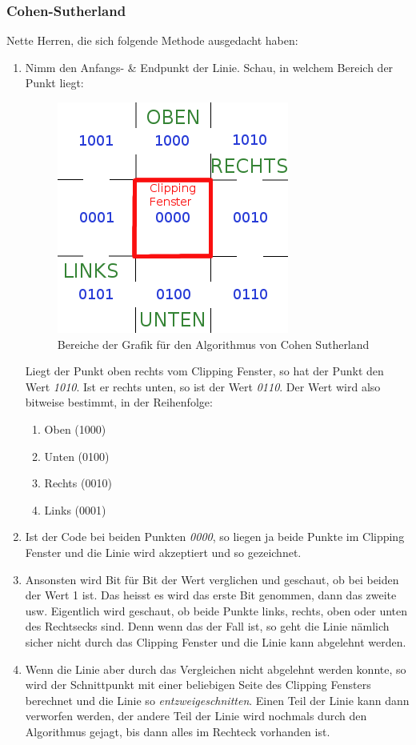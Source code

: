 \subsubsection{Cohen-Sutherland}
Nette Herren, die sich folgende Methode ausgedacht haben:
\begin{enumerate}
	\item Nimm den Anfangs- \& Endpunkt der Linie. Schau, in welchem Bereich der Punkt liegt:
	
	\begin{figure}[!ht]
		\centering
		\includegraphics[width=0.3\linewidth]{fig/cohen_sutherland}
		\caption{Bereiche der Grafik für den Algorithmus von Cohen Sutherland}
		\label{fig:cohen_sutherland}
	\end{figure}
	
	Liegt der Punkt oben rechts vom Clipping Fenster, so hat der Punkt den Wert \textit{1010}. Ist er rechts unten, so ist der Wert \textit{0110}. Der Wert wird also bitweise bestimmt, in der Reihenfolge:
	\begin{enumerate}
		\item Oben (1000)
		\item Unten (0100)
		\item Rechts (0010)
		\item Links (0001)
	\end{enumerate}
	\item Ist der Code bei beiden Punkten \textit{0000}, so liegen ja beide Punkte im Clipping Fenster und die Linie wird akzeptiert und so gezeichnet.
	\item Ansonsten wird Bit für Bit der Wert verglichen und geschaut, ob bei beiden der Wert 1 ist. Das heisst es wird das erste Bit genommen, dann das zweite usw. Eigentlich wird geschaut, ob beide Punkte links, rechts, oben oder unten des Rechtsecks sind. Denn wenn das der Fall ist, so geht die Linie nämlich sicher nicht durch das Clipping Fenster und die Linie kann abgelehnt werden.
	\item Wenn die Linie aber durch das Vergleichen nicht abgelehnt werden konnte, so wird der Schnittpunkt mit einer beliebigen Seite des Clipping Fensters berechnet und die Linie so \textit{entzweigeschnitten}. Einen Teil der Linie kann dann verworfen werden, der andere Teil der Linie wird nochmals durch den Algorithmus gejagt, bis dann alles im Rechteck vorhanden ist.
\end{enumerate}

